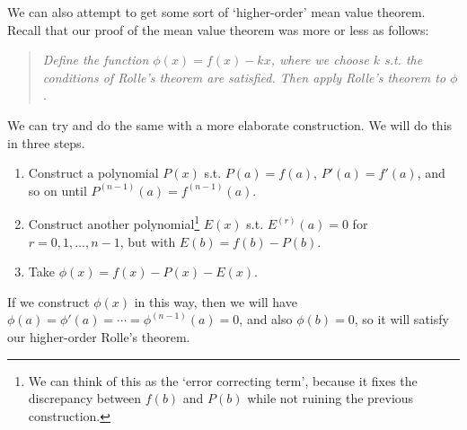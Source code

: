 We can also attempt to get some sort of `higher-order' mean value theorem. Recall that our proof of the mean value theorem was more or less as follows:
\begin{quotation}\noindent
	\emph{Define the function $\phi(x) = f(x) - kx$, where we choose $k$ s.t. the conditions of Rolle's theorem are satisfied.
	Then apply Rolle's theorem to $\phi$.}
\end{quotation}
We can try and do the same with a more elaborate construction. We will do this in three steps.
\begin{enumerate}
	\item Construct a polynomial $P(x)$ s.t. $P(a) = f(a)$, $P'(a) = f'(a)$, and so on until $P^{(n - 1)}(a) = f^{(n - 1)}(a)$.
	\item Construct another polynomial\footnote{We can think of this as the `error correcting term', because it fixes the discrepancy between $f(b)$ and $P(b)$ while not ruining the previous construction.} $E(x)$ s.t. $E^{(r)}(a) = 0$ for $r = 0, 1, \dots, n - 1$, but with $E(b) = f(b) - P(b)$.
	\item Take $\phi(x) = f(x) - P(x) - E(x)$.
\end{enumerate}
If we construct $\phi(x)$ in this way, then we will have $\phi(a) = \phi'(a) = \cdots = \phi^{(n - 1)}(a) = 0$, and also $\phi(b) = 0$, so it will satisfy our higher-order Rolle's theorem.

